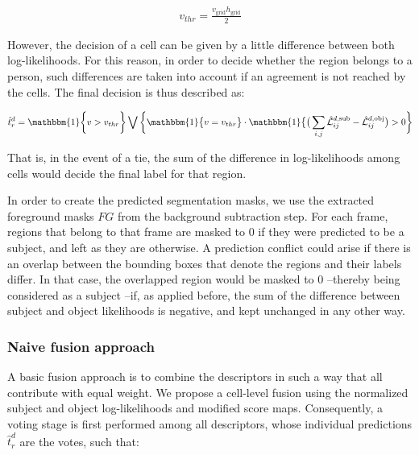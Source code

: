 \documentclass[10pt,twocolumn,letterpaper]{article}
\begin{document}
\begin{gather} \label{eq:votethr}
v_{thr} = \frac{v_\mathrm{grid}h_\mathrm{grid}}{2}
\end{gather}

However, the decision of a cell can be given by a little difference between both log-likelihoods. For this reason, in order to decide whether the region belongs to a person, such differences are taken into account if an agreement is not reached by the cells. The final decision is thus described as:
%

\begin{gather}
\hat{t}_{r}^{d} = \mathbbm{1} \bigg\{ v > v_{thr} \bigg\} \bigvee \bigg\{ \mathbbm{1}\big\{v = v_{thr}\big\} \cdot   \mathbbm{1}\big\{ \big( \sum_{i,j} \hat{\mathcal{L}}_{ij}^{d,\mathrm{sub}} - \hat{\mathcal{L}}_{ij}^{d,\mathrm{obj}} \big) > 0 \bigg\}
\end{gather}

That is, in the event of a tie, the sum of the difference in log-likelihoods among cells would decide the final label for that region. 

In order to create the predicted segmentation masks, we use the extracted foreground masks $FG$ from the background subtraction step. For each frame, regions that belong to that frame are masked to 0 if they were predicted to be a subject, and left as they are otherwise. A prediction conflict could arise if there is an overlap between the bounding boxes that denote the regions and their labels differ. In that case, the overlapped region would be masked to 0 --thereby being considered as a subject --if, as applied before, the sum of the difference between subject and object likelihoods is negative, and kept unchanged in any other way.

\subsubsection{Naive fusion approach}
A basic fusion approach is to combine the descriptors in such a way that all contribute with equal weight. We propose a cell-level fusion using the normalized subject and object log-likelihoods and modified score maps. Consequently, a voting stage is first performed among all descriptors, whose individual predictions $\hat{t}_{r}^{d}$ are the votes, such that:
\end{document}
